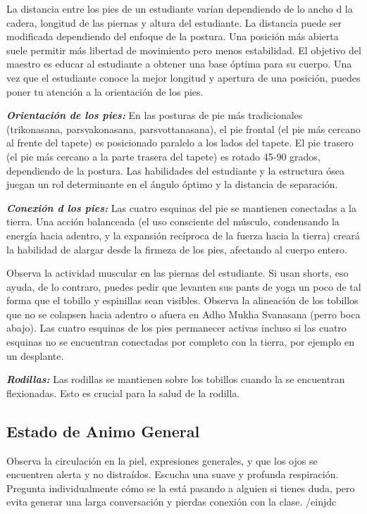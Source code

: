 La distancia entre los pies de un estudiante varían dependiendo de lo ancho d la cadera, longitud de las piernas y altura del estudiante. La distancia puede ser modificada dependiendo del enfoque de la postura. Una posición más abierta suele permitir más libertad de movimiento pero menos estabilidad. El objetivo del maestro es educar al estudiante a obtener una base óptima para su cuerpo. Una vez que el estudiante conoce la mejor longitud y apertura de una posición, puedes poner tu atención a la orientación de los pies.

\textbf{\textit{Orientación de los pies:}}
En las posturas de pie más tradicionales (trikonasana, parsvakonasana, parsvottanasana), el pie frontal (el pie más cercano al frente del tapete) es posicionado paralelo a los lados del tapete. El pie trasero (el pie más cercano a la parte trasera del tapete) es rotado 45-90 grados, dependiendo de la postura. Las habilidades del estudiante y la estructura ósea juegan un rol determinante en el ángulo óptimo y la distancia de separación.

\textbf{\textit{Conexión d los pies:}}
Las cuatro esquinas del pie se mantienen conectadas a la tierra. Una acción balanceada (el uso consciente del músculo, condensando la energía hacia adentro, y la expansión recíproca de la fuerza hacia la tierra) creará la habilidad de alargar desde la firmeza de los pies, afectando al cuerpo entero.

Observa la actividad muscular en las piernas del estudiante. Si usan shorts, eso ayuda, de lo contraro, puedes pedir que levanten sus pants de yoga un poco de tal forma que el tobillo y espinillas sean visibles. Observa la alineación de los tobillos que no se colapsen hacia adentro o afuera en Adho Mukha Svanasana (perro boca abajo). Las cuatro esquinas de los pies permanecer activas incluso si las cuatro esquinas no se encuentran conectadas por completo con la tierra, por ejemplo en un desplante.

\textbf{\textit{Rodillas:}}
Las rodillas se mantienen sobre los tobillos cuando la se encuentran flexionadas. Esto es crucial para la salud de la rodilla.

\subsection{Estado de Animo General}
Observa la circulación en la piel, expresiones generales, y que los ojos se encuentren alerta y no distraídos. Escucha una suave y profunda respiración. Pregunta individualmente cómo se la está pasando a alguien si tienes duda, pero evita generar una larga conversación y pierdas conexión con la clase.
/einjdc

